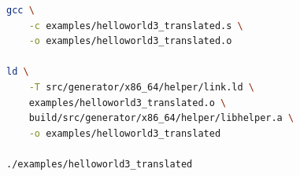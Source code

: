 \begin{frame}[fragile]
\begin{columns}[c]
        \begin{lstlisting}[language=bash, basicstyle=\small\ttfamily, extendedchars=true,escapeinside={@@}]
gcc \
    -c examples/helloworld3_translated.s \
    -o examples/helloworld3_translated.o

ld \
    -T src/generator/x86_64/helper/link.ld \
    examples/helloworld3_translated.o \
    build/src/generator/x86_64/helper/libhelper.a \
    -o examples/helloworld3_translated

./examples/helloworld3_translated
    \end{lstlisting}
    \end{columns}
\end{frame}
\clearpage


